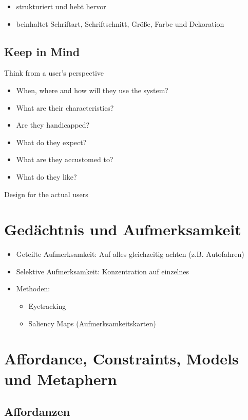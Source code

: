 \begin{itemize}
\item
  strukturiert und hebt hervor
\item
  beinhaltet Schriftart, Schriftschnitt, Größe, Farbe und Dekoration
\end{itemize}

\subsection{Keep in Mind}

Think from a user's perspective

\begin{itemize}
\item
  When, where and how will they use the system?
\item
  What are their characteristics?
\item
  Are they handicapped?
\item
  What do they expect?
\item
  What are they accustomed to?
\item
  What do they like?
\end{itemize}

Design for the actual users

\section{Gedächtnis und Aufmerksamkeit}

\begin{itemize}
\item
  Geteilte Aufmerksamkeit: Auf alles gleichzeitig achten (z.B.
  Autofahren)
\item
  Selektive Aufmerksamkeit: Konzentration auf einzelnes
\item
  Methoden:

  \begin{itemize}
  \item
    Eyetracking
  \item
    Saliency Maps (Aufmerksamkeitskarten)
  \end{itemize}
\end{itemize}

\section{Affordance, Constraints, Models und Metaphern}

\subsection{Affordanzen}

